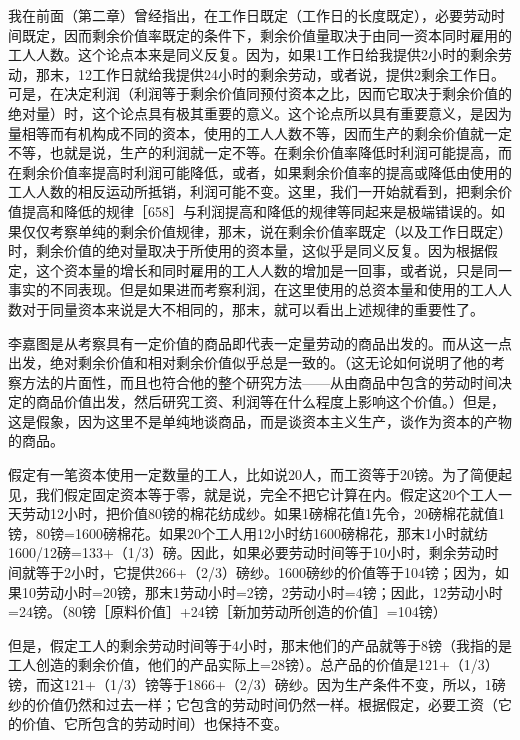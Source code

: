 我在前面（第二章）曾经指出，在工作日既定（工作日的长度既定），必要劳动时间既定，因而剩余价值率既定的条件下，剩余价值量取决于由同一资本同时雇用的工人人数。这个论点本来是同义反复。因为，如果1工作日给我提供2小时的剩余劳动，那末，12工作日就给我提供24小时的剩余劳动，或者说，提供2剩余工作日。可是，在决定利润（利润等于剩余价值同预付资本之比，因而它取决于剩余价值的绝对量）时，这个论点具有极其重要的意义。这个论点所以具有重要意义，是因为量相等而有机构成不同的资本，使用的工人人数不等，因而生产的剩余价值就一定不等，也就是说，生产的利润就一定不等。在剩余价值率降低时利润可能提高，而在剩余价值率提高时利润可能降低，或者，如果剩余价值率的提高或降低由使用的工人人数的相反运动所抵销，利润可能不变。这里，我们一开始就看到，把剩余价值提高和降低的规律［658］与利润提高和降低的规律等同起来是极端错误的。如果仅仅考察单纯的剩余价值规律，那末，说在剩余价值率既定（以及工作日既定）时，剩余价值的绝对量取决于所使用的资本量，这似乎是同义反复。因为根据假定，这个资本量的增长和同时雇用的工人人数的增加是一回事，或者说，只是同一事实的不同表现。但是如果进而考察利润，在这里使用的总资本量和使用的工人人数对于同量资本来说是大不相同的，那末，就可以看出上述规律的重要性了。

李嘉图是从考察具有一定价值的商品即代表一定量劳动的商品出发的。而从这一点出发，绝对剩余价值和相对剩余价值似乎总是一致的。（这无论如何说明了他的考察方法的片面性，而且也符合他的整个研究方法——从由商品中包含的劳动时间决定的商品价值出发，然后研究工资、利润等在什么程度上影响这个价值。）但是，这是假象，因为这里不是单纯地谈商品，而是谈资本主义生产，谈作为资本的产物的商品。

假定有一笔资本使用一定数量的工人，比如说20人，而工资等于20镑。为了简便起见，我们假定固定资本等于零，就是说，完全不把它计算在内。假定这20个工人一天劳动12小时，把价值80镑的棉花纺成纱。如果1磅棉花值1先令，20磅棉花就值1镑，80镑=1600磅棉花。如果20个工人用12小时纺1600磅棉花，那末1小时就纺1600/12磅=133+（1/3）磅。因此，如果必要劳动时间等于10小时，剩余劳动时间就等于2小时，它提供266+（2/3）磅纱。1600磅纱的价值等于104镑；因为，如果10劳动小时=20镑，那末1劳动小时=2镑，2劳动小时=4镑；因此，12劳动小时=24镑。（80镑［原料价值］+24镑［新加劳动所创造的价值］=104镑）

但是，假定工人的剩余劳动时间等于4小时，那末他们的产品就等于8镑（我指的是工人创造的剩余价值，他们的产品实际上=28镑）。总产品的价值是121+（1/3）镑，而这121+（1/3）镑等于1866+（2/3）磅纱。因为生产条件不变，所以，1磅纱的价值仍然和过去一样；它包含的劳动时间仍然一样。根据假定，必要工资（它的价值、它所包含的劳动时间）也保持不变。

